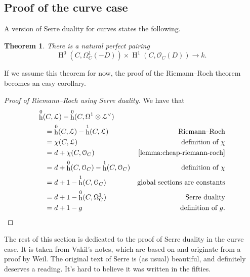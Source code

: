 \documentclass[10pt,a4paper]{article}
\theoremstyle{lecture}
\newtheorem{theorem}{Theorem}
\DeclareMathOperator\hh{h}
\DeclareMathOperator\HH{H}
\begin{document}
\subsection{Proof of the curve case}
\label{subsection:serre-duality-curves}
A version of Serre duality for curves states the following.
\begin{theorem}
  \label{theorem:serre-duality-curves}
  There is a natural perfect pairing
  \begin{equation}
    \HH^0(C,\Omega_C^1(-D))\times\HH^1(C,\mathcal{O}_C(D))\to k.
  \end{equation}
\end{theorem}
If we assume this theorem for now, the proof of the Riemann--Roch theorem becomes an easy corollary.
\begin{proof}[Proof of Riemann--Roch using Serre duality]
  We have that
  \begin{equation}
    \begin{aligned}
      &\hh^0(C,\mathcal{L})-\hh^0(C,\Omega^1\otimes\mathcal{L}^\vee) \\
      &\quad=\hh^0(C,\mathcal{L})-\hh^1(C,\mathcal{L}) & \text{Riemann--Roch} \\
      &\quad=\chi(C,\mathcal{L}) & \text{definition of~$\chi$} \\
      &\quad=d+\chi(C,\mathcal{O}_C) & \text{\cref{lemma:cheap-riemann-roch}} \\
      &\quad=d+\hh^0(C,\mathcal{O}_C)-\hh^1(C,\mathcal{O}_C) & \text{definition of~$\chi$} \\
      &\quad=d+1-\hh^1(C,\mathcal{O}_C) & \text{global sections are constants} \\
      &\quad=d+1-\hh^0(C,\Omega_C^1) & \text{Serre duality} \\
      &\quad=d+1-g & \text{definition of $g$}.
    \end{aligned}
  \end{equation}
\end{proof}

The rest of this section is dedicated to the proof of Serre duality in the curve case. It is taken from Vakil's notes, which are based on \cite[\S 2]{serre-groupes-algebriques-et-corps-de-classes} and originate from a proof by Weil. The original text of Serre is (as usual) beautiful, and definitely deserves a reading. It's hard to believe it was written in the fifties.
\end{document}
